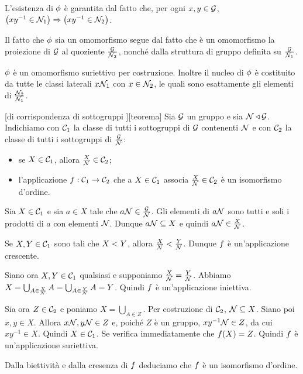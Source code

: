 \Proof
L'esistenza di $\phi$ \`e garantita dal fatto che,
per ogni $x, y \in \mathcal{G}$,
$\left ( xy^{-1} \in \mathcal{N}_1 \right ) \Rightarrow \left ( xy^{-1} \in \mathcal{N}_2 \right )$.
\par
Il fatto che $\phi$ sia un omomorfismo segue dal fatto che \`e un
omomorfismo la proiezione di $\mathcal{G}$ al quoziente
$\frac{\mathcal{G}}{\mathcal{N}_2}$, nonch\'e
dalla struttura di gruppo definita su $\frac{\mathcal{G}}{\mathcal{N}_1}$.
\par
$\phi$ \`e un omomorfismo suriettivo per costruzione.
Inoltre il nucleo di $\phi$ \`e costituito da tutte le classi laterali
$x\mathcal{N}_1$ con $x \in \mathcal{N}_2$, le quali sono
esattamente gli elementi di $\frac{\mathcal{N}_2}{\mathcal{N}_1}$.
\EndProof
\begin{Theorem}
[di corrispondenza di sottogruppi ][teorema]
	Sia $\mathcal{G}$ un gruppo e sia
	$\mathcal{N} \triangleleft \mathcal{G}$.
	Indichiamo con $\mathcal{C}_1$ la classe di tutti i sottogruppi
	di $\mathcal{G}$ contenenti $\mathcal{N}$ e con $\mathcal{C}_2$ la classe
	di tutti i sottogruppi di $\frac{\mathcal{G}}{\mathcal{N}}$:
	\begin{itemize}
		\item
		se $X \in \mathcal{C}_1$,
		allora $\frac{X}{\mathcal{N}} \in \mathcal{C}_2$;
		\item
		l'applicazione $f: \mathcal{C}_1 \rightarrow \mathcal{C}_2$ che a
		$X \in \mathcal{C}_1$ associa
		$\frac{X}{\mathcal{N}} \in \mathcal{C}_2$
		\`e un isomorfismo d'ordine.
	\end{itemize}
\end{Theorem}
\Proof
Sia $X \in \mathcal{C}_1$ e sia $a \in X$ tale che
$a\mathcal{N} \in \frac{\mathcal{G}}{\mathcal{N}}$.
Gli elementi di $a\mathcal{N}$ sono tutti e soli i prodotti di
$a$ con elementi $\mathcal{N}$. Dunque
$a\mathcal{N} \subseteq X$ e quindi
$a\mathcal{N} \in \frac{X}{\mathcal{N}}$.
\par
Se $X, Y \in \mathcal{C}_1$ sono tali che $X < Y$, allora
$\frac{X}{\mathcal{N}} < \frac{Y}{\mathcal{N}}$.
Dunque $f$ \`e un'applicazione crescente.
\par
Siano ora $X, Y \in \mathcal{C}_1$ qualsiasi e supponiamo
$\frac{X}{\mathcal{N}} = \frac{Y}{\mathcal{N}}$.
Abbiamo
$X =
\bigcup_{A \in \frac{X}{\mathcal{N}}} A =
\bigcup_{A \in \frac{Y}{\mathcal{N}}} A =
Y$. Quindi $f$ \`e un'applicazione iniettiva.
\par
Sia ora $Z \in \mathcal{C}_2$ e poniamo $X = \bigcup_{A \in Z}$.
Per costruzione di $\mathcal{C}_2$, $\mathcal{N} \subseteq X$.
Siano poi $x, y \in X$. Allora
$x\mathcal{N}, y\mathcal{N} \in Z$ e,
poich\'e $Z$ \`e un gruppo,
$xy^{-1}\mathcal{N} \in Z$, da cui $xy^{-1} \in X$.
Quindi $X \in \mathcal{C}_1$.
Se verifica immediatamente che $f(X) = Z$. Quindi $f$ \`e
un'applicazione suriettiva.
\par
Dalla biettivit\`a e dalla cresenza di $f$ deduciamo che
$f$ \`e un isomorfismo d'ordine.
\EndProof
